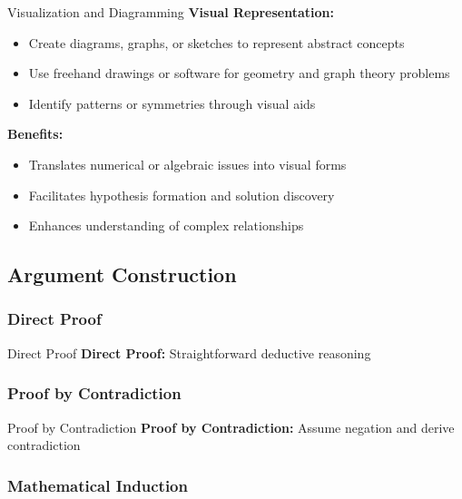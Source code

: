 \documentclass[12pt]{article}
\begin{document}
	\begin{strategybox}{Visualization and Diagramming}
		\textbf{Visual Representation:}
		\begin{itemize}
			\item Create diagrams, graphs, or sketches to represent abstract concepts
			\item Use freehand drawings or software for geometry and graph theory problems
			\item Identify patterns or symmetries through visual aids
		\end{itemize}
		
		\textbf{Benefits:}
		\begin{itemize}
			\item Translates numerical or algebraic issues into visual forms
			\item Facilitates hypothesis formation and solution discovery
			\item Enhances understanding of complex relationships
		\end{itemize}
	\end{strategybox}
	
	\subsection{Argument Construction}
	
	\subsubsection{Direct Proof}

	\begin{strategybox}{Direct Proof}
		\textbf{Direct Proof:} Straightforward deductive reasoning
	\end{strategybox}

	\subsubsection{Proof by Contradiction}

	\begin{strategybox}{Proof by Contradiction}
		\textbf{Proof by Contradiction:} Assume negation and derive contradiction
	\end{strategybox}

	\subsubsection{Mathematical Induction}
\end{document}
